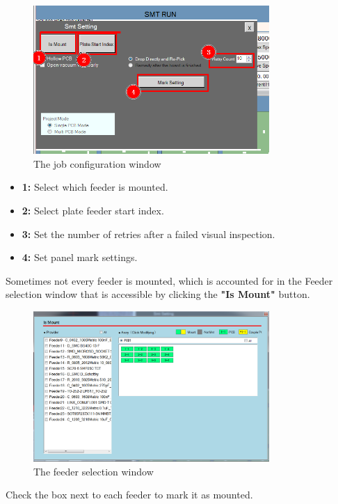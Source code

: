 \documentclass[a4paper,10pt]{report}
\begin{document}
 \begin{figure}[!htb]
 \centering
 \includegraphics[width=0.8\textwidth]{images/scrot32.png}
 \caption{The job configuration window}
\end{figure}
\begin{itemize}
 \item \textbf{1: } Select which feeder is mounted.
 \item \textbf{2: } Select plate feeder start index.
 \item \textbf{3: } Set the number of retries after a failed visual inspection.
 \item \textbf{4: } Set panel mark settings.
\end{itemize}
\newpage
Sometimes not every feeder is mounted, which is accounted for in the Feeder selection window that is accessible by clicking the \textbf{"Is Mount"} button.\\
 \begin{figure}[!htb]
 \centering
 \includegraphics[width=0.8\textwidth]{images/scrot33.png}
 \caption{The feeder selection window}
\end{figure}
Check the box next to each feeder to mark it as mounted.\\
\end{document}
